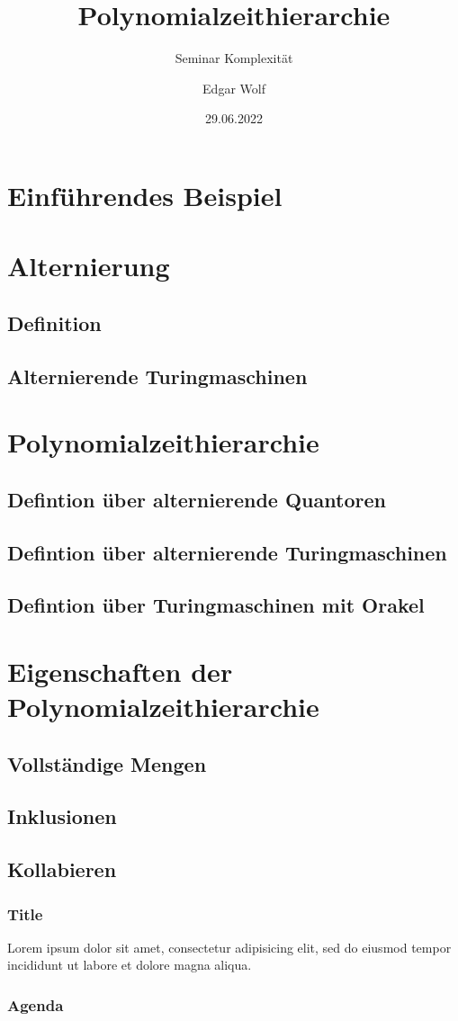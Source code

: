 \documentclass{beamer}
\title{Polynomialzeithierarchie}
\subtitle{Seminar Komplexität}
\author{Edgar Wolf}
\institute{Hochschule Kempten}
\date{29.06.2022}
\begin{document}
\begin{frame}
    \titlepage
\end{frame}


\section{Einführendes Beispiel}

\section{Alternierung}
\subsection{Definition}
\subsection{Alternierende Turingmaschinen}

\section{Polynomialzeithierarchie}
\subsection{Defintion über alternierende Quantoren}
\subsection{Defintion über alternierende Turingmaschinen}
\subsection{Defintion über Turingmaschinen mit Orakel}

\section{Eigenschaften der Polynomialzeithierarchie}
\subsection{Vollständige Mengen}
\subsection{Inklusionen}
\subsection{Kollabieren}

\begin{frame}
    \frametitle{Title}
    Lorem ipsum dolor sit amet, consectetur adipisicing elit, sed do eiusmod tempor incididunt ut labore et dolore magna aliqua.
\end{frame}

\begin{frame}
\frametitle{Agenda}
\tableofcontents
\end{frame}
\end{document}
